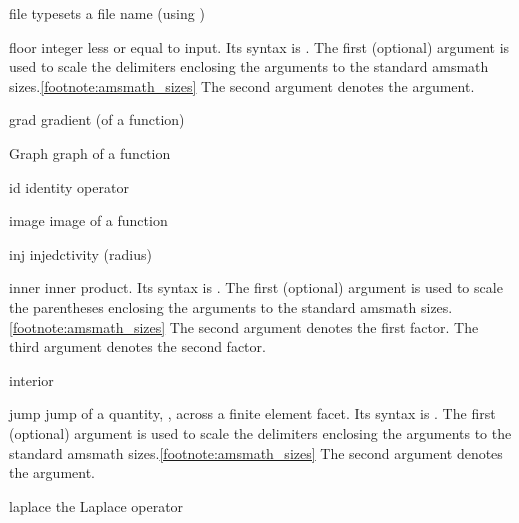 \documentclass[english,a4paper,DIV=12,parskip=full,oneside]{scrartcl}
\begin{document}
\begin{commandlist}
        \item[file] typesets a file name (using )
            \par{}
        \item[floor] integer less or equal to input.
            Its syntax is .
            The first (optional) argument is used to scale the delimiters enclosing the arguments to the standard amsmath sizes.\cref{footnote:amsmath_sizes}
            The second argument denotes the argument.
            \par{}
            \par{}
        \item[grad] gradient (of a function)  %
        \item[Graph] graph of a function \mathCodeExample{\Graph}
        \item[id] identity operator \mathCodeExample{\id}
        \item[image] image of a function \mathCodeExample{\image}
        \item[inj] injedctivity (radius) \mathCodeExample{\inj}
        \item[inner] inner product.
            Its syntax is .
            The first (optional) argument is used to scale the parentheses enclosing the arguments to the standard amsmath sizes.\cref{footnote:amsmath_sizes}
            The second argument denotes the first factor.
            The third argument denotes the second factor.
            \par{}
            \par{}
        \item[interior] \mathCodeExample{\interior}
        \item[jump] jump of a quantity, \eg, across a finite element facet.
            Its syntax is .
            The first (optional) argument is used to scale the delimiters enclosing the arguments to the standard amsmath sizes.\cref{footnote:amsmath_sizes}
            The second argument denotes the argument.
            \par{}
            \par{}
        \item[laplace] the Laplace operator  %

\end{commandlist}
\end{document}
